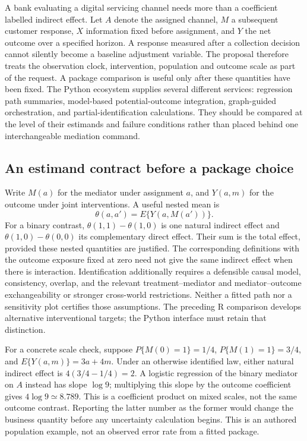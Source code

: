 A bank evaluating a digital servicing channel needs more than a coefficient labelled indirect effect. Let $A$ denote the assigned channel, $M$ a subsequent customer response, $X$ information fixed before assignment, and $Y$ the net outcome over a specified horizon. A response measured after a collection decision cannot silently become a baseline adjustment variable. The proposal therefore treats the observation clock, intervention, population and outcome scale as part of the request. A package comparison is useful only after these quantities have been fixed. The Python ecosystem supplies several different services: regression path summaries, model-based potential-outcome integration, graph-guided orchestration, and partial-identification calculations. They should be compared at the level of their estimands and failure conditions rather than placed behind one interchangeable mediation command. \cite{exec25_pymed_statsmodels,exec25_pymed_pingouin,exec25_pymed_dowhy,exec25_pymed_process,exec25_pymed_choice}

\subsection{An estimand contract before a package choice}
Write $M(a)$ for the mediator under assignment $a$, and $Y(a,m)$ for the outcome under joint interventions. A useful nested mean is
\[
 \theta(a,a')=E\{Y(a,M(a'))\}.
\]
For a binary contrast, $\theta(1,1)-\theta(1,0)$ is one natural indirect effect and $\theta(1,0)-\theta(0,0)$ its complementary direct effect. Their sum is the total effect, provided these nested quantities are justified. The corresponding definitions with the outcome exposure fixed at zero need not give the same indirect effect when there is interaction. Identification additionally requires a defensible causal model, consistency, overlap, and the relevant treatment--mediator and mediator--outcome exchangeability or stronger cross-world restrictions. Neither a fitted path nor a sensitivity plot certifies those assumptions. The preceding R comparison develops alternative interventional targets; the Python interface must retain that distinction. \cite{exec25_pymed_choice,exec25_pymed_sharp_paper}

For a concrete scale check, suppose $P\{M(0)=1\}=1/4$, $P\{M(1)=1\}=3/4$, and $E\{Y(a,m)\}=3a+4m$. Under an otherwise identified law, either natural indirect effect is $4(3/4-1/4)=2$. A logistic regression of the binary mediator on $A$ instead has slope $\log 9$; multiplying this slope by the outcome coefficient gives $4\log9\simeq8.789$. This is a coefficient product on mixed scales, not the same outcome contrast. Reporting the latter number as the former would change the business quantity before any uncertainty calculation begins. This is an authored population example, not an observed error rate from a fitted package. \cite{exec25_pymed_choice}

